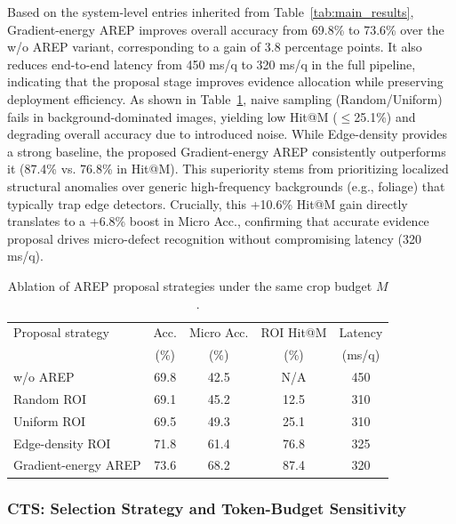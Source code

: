 \documentclass[journal,twoside,web]{ieeecolor}
\begin{document}
Based on the system-level entries inherited from Table~\ref{tab:main_results}, Gradient-energy AREP improves overall accuracy from 69.8\% to 73.6\% over the w/o AREP variant, corresponding to a gain of 3.8 percentage points.
It also reduces end-to-end latency from 450 ms/q to 320 ms/q in the full pipeline, indicating that the proposal stage improves evidence allocation while preserving deployment efficiency.
As shown in Table~\ref{tab:arep_strategy_ablation}, naive sampling (Random/Uniform) fails in background-dominated images, yielding low Hit@M ($\le$25.1\%) and degrading overall accuracy due to introduced noise. While Edge-density provides a strong baseline, the proposed Gradient-energy AREP consistently outperforms it (87.4\% vs. 76.8\% in Hit@M). This superiority stems from prioritizing localized structural anomalies over generic high-frequency backgrounds (e.g., foliage) that typically trap edge detectors. Crucially, this +10.6\% Hit@M gain directly translates to a +6.8\% boost in Micro Acc., confirming that accurate evidence proposal drives micro-defect recognition without compromising latency (320 ms/q).

\begin{table}[t]
  \centering
  \caption{Ablation of AREP proposal strategies under the same crop budget $M$.}
  \label{tab:arep_strategy_ablation}
  \footnotesize
  \setlength{\tabcolsep}{0pt}
  \renewcommand{\arraystretch}{1.05}
  \begin{tabular*}{\columnwidth}{@{\extracolsep{\fill}}lcccc@{}}
    \toprule
    Proposal strategy & Acc. & Micro Acc. & ROI Hit@M & Latency \\
    & (\%) & (\%) & (\%) & (ms/q) \\
    \midrule
    w/o AREP             & 69.8 & 42.5 & N/A  & 450 \\
    Random ROI           & 69.1 & 45.2 & 12.5 & 310 \\
    Uniform ROI          & 69.5 & 49.3 & 25.1 & 310 \\
    Edge-density ROI     & 71.8 & 61.4 & 76.8 & 325 \\
    Gradient-energy AREP & 73.6 & 68.2 & 87.4 & 320 \\
    \bottomrule
  \end{tabular*}
\end{table}

\subsubsection{CTS: Selection Strategy and Token-Budget Sensitivity}
\label{sec:ablation_cts}
\end{document}
